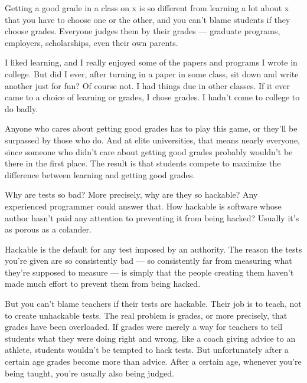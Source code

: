 Getting a good grade in a class on x is so different from learning a lot
about x that you have to choose one or the other, and you can't blame
students if they choose grades. Everyone judges them by their grades ---
graduate programs, employers, scholarships, even their own parents.

I liked learning, and I really enjoyed some of the papers and programs I
wrote in college. But did I ever, after turning in a paper in some
class, sit down and write another just for fun? Of course not. I had
things due in other classes. If it ever came to a choice of learning or
grades, I chose grades. I hadn't come to college to do badly.

Anyone who cares about getting good grades has to play this game, or
they'll be surpassed by those who do. And at elite universities, that
means nearly everyone, since someone who didn't care about getting good
grades probably wouldn't be there in the first place. The result is that
students compete to maximize the difference between learning and getting
good grades.

Why are tests so bad? More precisely, why are they so hackable? Any
experienced programmer could answer that. How hackable is software whose
author hasn't paid any attention to preventing it from being hacked?
Usually it's as porous as a colander.

Hackable is the default for any test imposed by an authority. The reason
the tests you're given are so consistently bad --- so consistently far
from measuring what they're supposed to measure --- is simply that the
people creating them haven't made much effort to prevent them from being
hacked.

But you can't blame teachers if their tests are hackable. Their job is
to teach, not to create unhackable tests. The real problem is grades, or
more precisely, that grades have been overloaded. If grades were merely
a way for teachers to tell students what they were doing right and
wrong, like a coach giving advice to an athlete, students wouldn't be
tempted to hack tests. But unfortunately after a certain age grades
become more than advice. After a certain age, whenever you're being
taught, you're usually also being judged.

